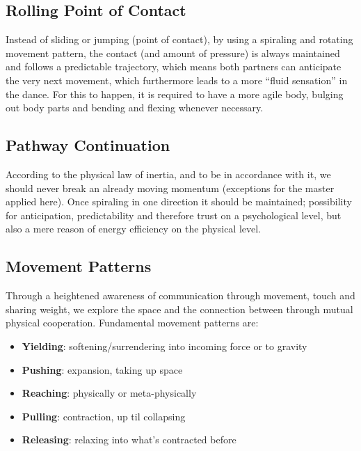 \subsection{Rolling Point of Contact}\label{subsec:rolling-point-of-contact}

Instead of sliding or jumping (point of contact), by using a spiraling and rotating movement pattern, the contact (and amount of pressure) is always maintained and follows a predictable trajectory, which means both partners can anticipate the very next movement, which furthermore leads to a more ``fluid sensation'' in the dance.
For this to happen, it is required to have a more agile body, bulging out body parts and bending and flexing whenever necessary.

\subsection{Pathway Continuation}\label{subsec:pathway-continuation}

According to the physical law of inertia, and to be in accordance with it, we should never break an already moving momentum (exceptions for the master applied here).
Once spiraling in one direction it should be maintained; possibility for anticipation, predictability and therefore trust on a psychological level, but also a mere reason of energy efficiency on the physical level.

\subsection{Movement Patterns}\label{subsec:movement-patterns}

Through a heightened awareness of communication through movement, touch and sharing weight, we explore the space and the connection between through mutual physical cooperation.
Fundamental movement patterns are:

\begin{itemize}
    \item \textbf{Yielding}: softening/surrendering into incoming force or to gravity
    \item \textbf{Pushing}: expansion, taking up space
    \item \textbf{Reaching}: physically or meta-physically
    \item \textbf{Pulling}: contraction, up til collapsing
    \item \textbf{Releasing}: relaxing into what's contracted before
\end{itemize}

